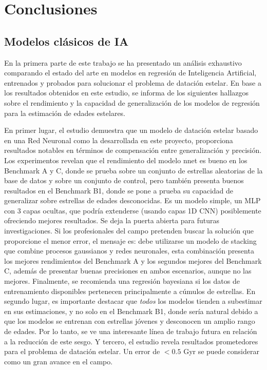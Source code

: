\chapter{Conclusiones}

\section{Modelos clásicos de IA}

En la primera parte de este trabajo se ha presentado un análisis exhaustivo comparando el estado del arte en modelos en regresión de Inteligencia Artificial, entrenados y probados para solucionar el problema de datación estelar. En base a los resultados obtenidos en este estudio, se informa de los siguientes hallazgos sobre el rendimiento y la capacidad de generalización de los modelos de regresión para la estimación de edades estelares.

En primer lugar, el estudio demuestra que un modelo de datación estelar basado en una Red Neuronal como la desarrollada en este proyecto, proporciona resultados notables en términos de compensación entre generalización y precisión. Los experimentos revelan que el rendimiento del modelo nnet es bueno en los Benchmark A y C, donde se prueba sobre un conjunto de estrellas aleatorias de la base de datos y sobre un conjunto de control, pero también presenta buenos resultados en el Benchmark B1, donde se pone a prueba su capacidad de generalizar sobre estrellas de edades desconocidas. Es un modelo simple, un MLP con 3 capas ocultas, que podría extenderse (usando capas 1D CNN) posiblemente ofreciendo mejores resultados. Se deja la puerta abierta para futuras investigaciones. Si los profesionales del campo pretenden buscar la solución que proporcione el menor error, el mensaje es: debe utilizarse un modelo de stacking que combine procesos gaussianos y redes neuronales, esta combinación presenta los mejores rendimientos del Benchmark A y los segundos mejores del Benchmark C, además de presentar buenas precisiones en ambos escenarios, aunque no las mejores. Finalmente, se recomienda una regresión bayesiana si los datos de entrenamiento disponibles pertenecen principalmente a cúmulos de estrellas.
En segundo lugar, es importante destacar que \emph{todos} los modelos tienden a subestimar en sus estimaciones, y no solo en el Benchmark B1, donde sería natural debido a que los modelos se entrenan con estrellas jóvenes y desconocen un amplio rango de edades. Por lo tanto, se ve una interesante línea de trabajo futura en relación a la reducción de este sesgo.
Y tercero, el estudio revela resultados prometedores para el problema de datación estelar. Un error de $<0.5$ Gyr se puede considerar como un gran avance en el campo.

